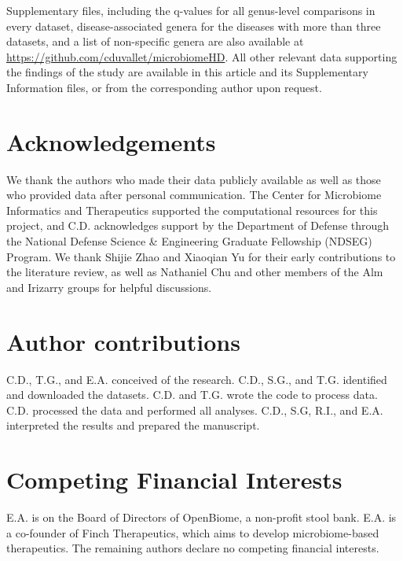 {Supplementary files, including the q-values for all genus-level comparisons in every dataset, disease-associated genera for the diseases with more than three datasets, and a list of non-specific genera are also available at \url{https://github.com/cduvallet/microbiomeHD}.
All other relevant data supporting the findings of the study are available in this article and its Supplementary Information files, or from the corresponding author upon request.

\section*{Acknowledgements}

We thank the authors who made their data publicly available as well as those who provided data after personal communication.
The Center for Microbiome Informatics and Therapeutics supported the computational resources for this project, and C.D. acknowledges support by the Department of Defense through the National Defense Science \& Engineering Graduate Fellowship (NDSEG) Program.
We thank Shijie Zhao and Xiaoqian Yu for their early contributions to the literature review, as well as Nathaniel Chu and other members of the Alm and Irizarry groups for helpful discussions.

\section*{Author contributions}

C.D., T.G., and E.A. conceived of the research.
C.D., S.G., and T.G. identified and downloaded the datasets.
C.D. and T.G. wrote the code to process data.
C.D. processed the data and performed all analyses.
C.D., S.G, R.I., and E.A. interpreted the results and prepared the manuscript.

\section*{Competing Financial Interests}

E.A. is on the Board of Directors of OpenBiome, a non-profit stool bank. E.A. is a co-founder of Finch Therapeutics, which aims to develop microbiome-based therapeutics.
The remaining authors declare no competing financial interests.

\FloatBarrier

}
